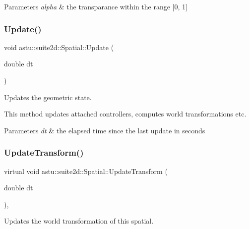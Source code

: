 \begin{DoxyParams}{Parameters}
{\em alpha} & the transparance within the range \mbox{[}0, 1\mbox{]} \\
\hline
\end{DoxyParams}
\mbox{\label{classastu_1_1suite2d_1_1Spatial_aca3b41b57739b71d27f50a38517cd30b}} 
\subsubsection{\texorpdfstring{Update()}{Update()}}
{\footnotesize\ttfamily void astu\+::suite2d\+::\+Spatial\+::\+Update (\begin{DoxyParamCaption}\item[{double}]{dt }\end{DoxyParamCaption})}

Updates the geometric state.

This method updates attached controllers, computes world transformations etc.


\begin{DoxyParams}{Parameters}
{\em dt} & the elapsed time since the last update in seconds \\
\hline
\end{DoxyParams}
\mbox{\label{classastu_1_1suite2d_1_1Spatial_a9c612ec47fd9d621aca423822b2b6132}} 
\subsubsection{\texorpdfstring{Update\+Transform()}{UpdateTransform()}}
{\footnotesize\ttfamily virtual void astu\+::suite2d\+::\+Spatial\+::\+Update\+Transform (\begin{DoxyParamCaption}\item[{double}]{dt }\end{DoxyParamCaption})\hspace{0.3cm}{\ttfamily [protected]}, {\ttfamily [virtual]}}

Updates the world transformation of this spatial.


